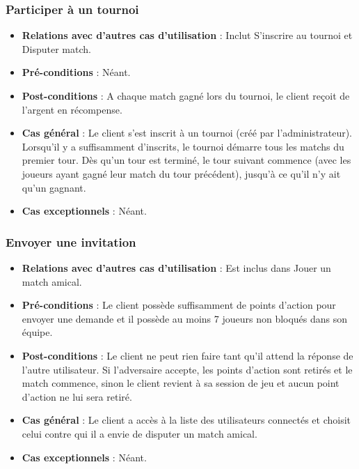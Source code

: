 \documentclass[a4paper,titlepage]{scrreprt}
\begin{document}
    \subsubsection{Participer à un tournoi}
      \begin{itemize}
        \item \textbf{Relations avec d'autres cas d'utilisation}  : Inclut S'inscrire au tournoi et Disputer match.
        \item \textbf{Pré-conditions} : Néant.
        \item \textbf{Post-conditions} : A chaque match gagné lors du tournoi, le client reçoit de l'argent en récompense.
        \item \textbf{Cas général} : Le client s'est inscrit à un tournoi (créé par l'administrateur). Lorsqu'il y a suffisamment d'inscrits, le tournoi démarre tous les matchs du premier tour. Dès qu'un tour est terminé, le tour suivant
        commence (avec les joueurs ayant gagné leur match du tour précédent), jusqu'à ce qu'il n'y ait qu'un gagnant.
        \item \textbf{Cas exceptionnels} : Néant.
      \end{itemize}

    \subsubsection{Envoyer une invitation}
      \begin{itemize}
        \item \textbf{Relations avec d'autres cas d'utilisation}  : Est inclus dans Jouer un match amical.
        \item \textbf{Pré-conditions} : Le client possède suffisamment de points d'action pour envoyer une demande et il possède au moins 7 joueurs non bloqués dans son équipe.
        \item \textbf{Post-conditions} : Le client ne peut rien faire tant qu'il attend la réponse de l'autre utilisateur. Si l'adversaire accepte, les points d'action sont retirés et le match commence, sinon le client revient à sa session de jeu et aucun point d'action ne lui sera retiré.
        \item \textbf{Cas général} : Le client a accès à la liste des utilisateurs connectés et choisit celui contre qui il a envie de disputer un match amical.
        \item \textbf{Cas exceptionnels} : Néant.
      \end{itemize}
\end{document}
